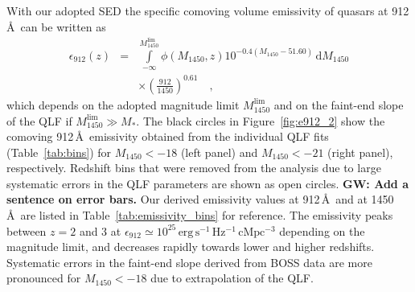 \documentclass[fleqn,usenatbib]{mnras}
\begin{document}
With our adopted SED the specific comoving volume emissivity of
quasars at 912\,\AA\ can be written as
\begin{eqnarray}\nonumber
\epsilon_{912}\left(z\right)&=&\int\limits_{-\infty}^{M_{1450}^\mathrm{lim}}\phi\left(M_{1450},z\right)10^{-0.4\left(M_{1450}-51.60\right)}\,\mathrm{d}M_{1450}\\
& &\times\left(\frac{912}{1450}\right)^{0.61}\quad,
\label{eqn:epsilon}
\end{eqnarray}
which depends on the adopted magnitude limit $M_{1450}^\mathrm{lim}$
and on the faint-end slope of the QLF if $M_{1450}^\mathrm{lim}\gg
M_*$.  The black circles in Figure~\ref{fig:e912_2} show the comoving
912\,\AA\ emissivity obtained from the individual QLF fits
(Table~\ref{tab:bins}) for $M_{1450}<-18$ (left panel) and
$M_{1450}<-21$ (right panel), respectively. Redshift bins that were
removed from the analysis due to large systematic errors in the QLF
parameters are shown as open circles.  \textbf{GW: Add a sentence on
  error bars.}  Our derived emissivity values at 912\,\AA\ and at
1450\,\AA\ are listed in Table~\ref{tab:emissivity_bins} for
reference.  The emissivity peaks between $z=2$ and 3 at
$\epsilon_{912}\simeq 10^{25}\,\mathrm{erg\, s^{-1}\, Hz^{-1}\,
  cMpc^{-3}}$ depending on the magnitude limit, and decreases rapidly
towards lower and higher redshifts.  Systematic errors in the
faint-end slope derived from BOSS data are more pronounced for
$M_{1450}<-18$ due to extrapolation of the QLF.
\end{document}
